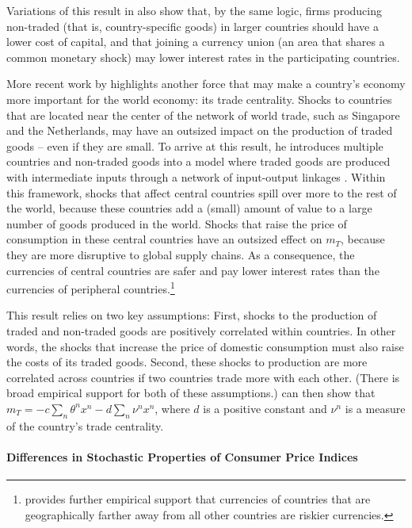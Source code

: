 \documentclass{ar-1col}
\begin{document}
Variations of this result in \citet{Hassan2013} also show that, by the same logic, firms producing non-traded (that is, country-specific goods) in larger countries should have a lower cost of capital, and that joining a currency union (an area that shares a common monetary shock) may lower interest rates in the participating countries.

More recent work by \citet{Richmond2019} highlights another force that may make a country's economy more important for the world economy: its trade centrality. Shocks to countries that are located near the center of the network of world trade, such as Singapore and the Netherlands, may have an outsized impact on the production of traded goods -- even if they are small. To arrive at this result, he introduces multiple countries and non-traded goods into a model where traded goods are produced with intermediate inputs through a network of input-output linkages \citep{LongPlosser1983, Acemogluetal2012}. Within this framework, shocks that affect central countries spill over more to the rest of the world, because these countries add a (small) amount of value to a large number of goods produced in the world. Shocks that raise the price of consumption in these central countries have an outsized effect on  $m_T$, because they are more disruptive to global supply chains. As a consequence, the currencies of central countries are safer and pay lower interest rates than the currencies of peripheral countries.\footnote{\citet{LustigRichmond2020} provides further empirical support that currencies of countries that are geographically farther away from all other countries are riskier currencies.}   

This result relies on two key assumptions: First, shocks to the production of traded and non-traded goods are positively correlated within countries. In other words, the shocks that increase the price of domestic consumption must also raise the costs of its traded goods. Second, these shocks to production are more correlated across countries if two countries trade more with each other. (There is broad empirical support for both of these assumptions.) \citet{Richmond2019} can then show that $m_{T} = -c \sum_{n} \theta^n x^n- d\sum_{n} \nu^n x^n$, where $d$ is a positive constant and $\nu^n$ is a measure of the country's trade centrality.


\paragraph*{Differences in Stochastic Properties of Consumer Price Indices}
\end{document}
